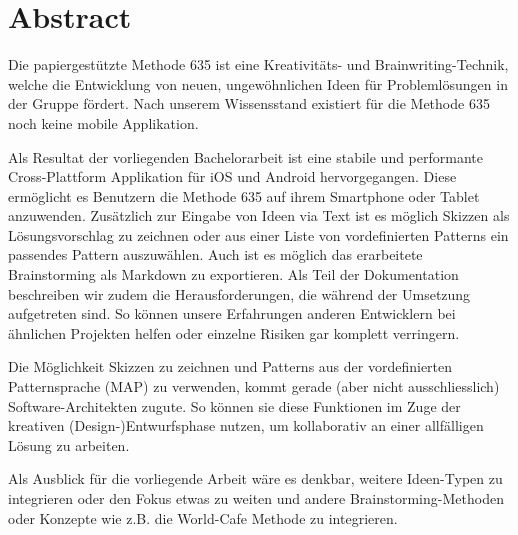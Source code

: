 \thispagestyle{empty}
\section*{Abstract}

Die papiergestützte Methode 635 ist eine Kreativitäts- und Brainwriting-Technik, welche die Entwicklung von neuen, ungewöhnlichen Ideen für Problemlösungen in der Gruppe fördert. Nach unserem Wissensstand existiert für die Methode 635 noch keine mobile Applikation. 

Als Resultat der vorliegenden Bachelorarbeit ist eine stabile und performante Cross-Plattform Applikation für iOS und Android hervorgegangen. Diese ermöglicht es Benutzern die Methode 635 auf ihrem Smartphone oder Tablet anzuwenden. Zusätzlich zur Eingabe von Ideen via Text ist es möglich Skizzen als Lösungsvorschlag zu zeichnen oder aus einer Liste von vordefinierten Patterns ein passendes Pattern auszuwählen. Auch ist es möglich das erarbeitete Brainstorming als Markdown zu exportieren. Als Teil der Dokumentation beschreiben wir zudem die Herausforderungen, die während der Umsetzung aufgetreten sind. So können unsere Erfahrungen anderen Entwicklern bei ähnlichen Projekten helfen oder einzelne Risiken gar komplett verringern.

Die Möglichkeit Skizzen zu zeichnen und Patterns aus der vordefinierten Patternsprache (MAP) zu verwenden, kommt gerade (aber nicht ausschliesslich) Software-Architekten zugute. So können sie diese Funktionen im Zuge der kreativen (Design-)Entwurfsphase nutzen, um kollaborativ an einer allfälligen Lösung zu arbeiten.

Als Ausblick für die vorliegende Arbeit wäre es denkbar, weitere Ideen-Typen zu integrieren oder den Fokus etwas zu weiten und andere Brainstorming-Methoden oder Konzepte wie z.B. die World-Cafe Methode zu integrieren. 


